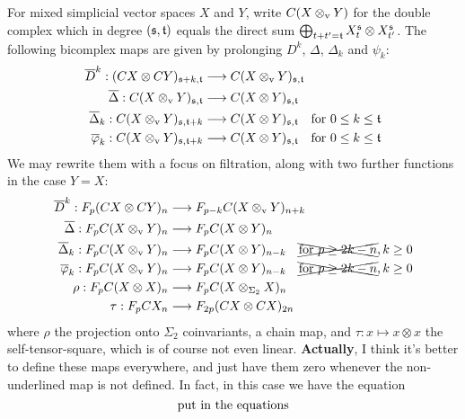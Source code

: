 \documentclass[10pt]{article}
\begin{document}
\begin{Adams sseq operations old version}
For mixed simplicial vector spaces $X$ and $Y$, write $C(X\otimes_\textup{v}Y)$ for the double complex which in degree $(\fraks,\frakt)$ equals the direct sum $\bigoplus_{t+t'=\frakt}X_t^\fraks\otimes X_{t'}^\fraks$. The following bicomplex maps are given by prolonging $D^k$, $\Delta$, $\Delta_k$ and $\psi_k$:
\begin{align*}
\overline{D}^k:(CX\otimes CY)_{\fraks+k,\frakt}&\to C(X\otimes_\textup{v}Y)_{\fraks,\frakt}\\
\overline{\Delta}:C(X\otimes_\textup{v} Y)_{\fraks,\frakt}&\to C(X\otimes Y)_{\fraks,\frakt}\\
\overline{\Delta}_k:C(X\otimes_\textup{v} Y)_{\fraks,\frakt+k}&\to C(X\otimes Y)_{\fraks,\frakt}\textup{\quad for $0\leq k\leq \frakt$}\\
\overline{\phi}_k:C(X\otimes_\textup{v} Y)_{\fraks,\frakt+k}&\to C(X\otimes Y)_{\fraks,\frakt}\textup{\quad for $0\leq k\leq \frakt$}
\end{align*}
We may rewrite them with a focus on filtration, along with two further functions in the case $Y=X$:
\begin{align*}
\overline{D}^k:F_{p}(CX\otimes CY)_{n}&\to F_{p-k}C(X\otimes_\textup{v}Y)_{n+k}\\
\overline{\Delta}:F_{p}C(X\otimes_\textup{v} Y)_{n}&\to F_{p}C(X\otimes Y)_{n}\\
\overline{\Delta}_k:F_{p}C(X\otimes_\textup{v} Y)_{n}&\to F_{p}C(X\otimes Y)_{n-k}\textup{\quad \xcancel{for $p\geq 2k-n$},\,$k\geq0$}\\
\overline{\phi}_k:F_{p}C(X\otimes_\textup{v} Y)_{n}&\to F_{p}C(X\otimes Y)_{n-k}\textup{\quad \xcancel{for $p\geq 2k-n$},\,$k\geq0$}\\
\rho:F_{p}C(X\otimes X)_{n}&\to F_{p}C(X\otimes_{\Sigma_2} X)_{n}\\
\tau:F_{p}CX_n&\to F_{2p}(CX\otimes CX)_{2n}
\end{align*}
where $\rho$ the projection onto $\Sigma_2$ coinvariants, a chain map, and $\tau:x\mapsto x\otimes x$ the self-tensor-square, which is of course not even linear. \textbf{Actually}, I think it's better to define these maps everywhere, and just have them zero whenever the non-underlined map is not defined. In fact, in this case we have the equation
\[\textup{put in the equations}\]



\end{Adams sseq operations old version}
\end{document}
